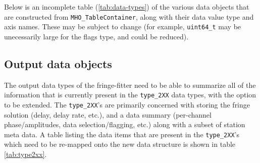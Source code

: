Below is an incomplete table (\ref{tab:data-types}) of the various data objects that are constructed from \texttt{MHO\_TableContainer}, along with their data value type and axis names. These may be subject to change (for example, \texttt{uint64\_t} may be unecessarily large for the flags type, and could be reduced).
\begin{center}
\end{center}

\subsection{Output data objects}

The output data types of the fringe-fitter need to be able to summarize all of the information that is currently present in the \texttt{type\_2XX} data types,
with the option to be extended. The \texttt{type\_2XX}'s are primarily concerned with storing the fringe solution (delay, delay rate, etc.), and a data summary (per-channel phase/amplitudes, data selection/flagging, etc.) along with a subset of station meta data. A table listing the data items that are present
in the \texttt{type\_2XX}'s which need to be re-mapped onto the new data structure is shown in table \ref{tab:type2xx}.  


